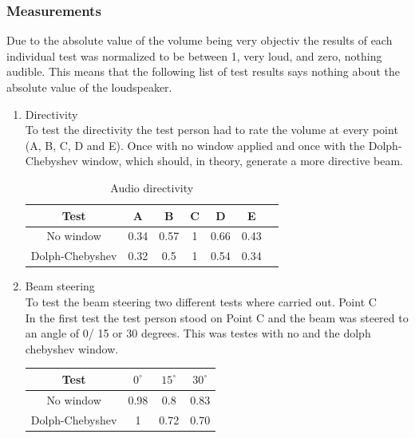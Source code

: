 \subsubsection{Measurements}
Due to the absolute value of the volume being very objectiv the results of each individual test was normalized to be between 1, very loud, and zero, nothing audible. This means that the following list of test results says nothing about the absolute value of the loudspeaker.
\begin{enumerate}
    \item Directivity \\
    To test the directivity the test person had to rate the volume at every point (A, B, C, D and E). Once with no window applied and once with the Dolph-Chebyshev window, which should, in theory, generate a more directive beam.
    \begin{center}
     \begin{table}[h!]
    \centering
    \begin{tabular}{ |c|c|c|c|c|c|c}
      \hline 
      Test & A & B & C & D & E \\ 
      \hline
     No window & 0.34 & 0.57 & 1 & 0.66 & 0.43 \\
     \hline
     Dolph-Chebyshev & 0.32 & 0.5 & 1 & 0.54 & 0.34 \\
     \hline
    \end{tabular}
    \caption{Audio directivity}
    \label{6.1.2_tab:music_audio_volume_directivity}
    \end{table}   
    \end{center}
    \item Beam steering \\
    To test the beam steering two different tests where carried out.
    \subitem Point C\\
    In the first test the test person stood on Point C and the beam was steered to an angle of 0/ 15 or 30 degrees. This was testes with no and the dolph chebyshev window.
    \begin{center}
     \begin{table}[h!]
    \centering
    \begin{tabular}{ |c|c|c|c|}
      \hline 
      Test & $0^\circ$ & $15^\circ$ & $30^\circ$ \\ 
      \hline
     No window & 0.98 & 0.8 & 0.83 \\
     \hline
     Dolph-Chebyshev & 1 & 0.72 & 0.70 \\
     \hline
    \end{tabular}

\end{table}
\end{center}
\end{enumerate}
